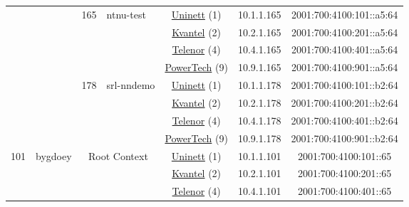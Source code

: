 \begin{small}
\begin{center}
\begin{longtable}{|c|c|c|c|c|c|c|c|}
  &  & \multirow{4}{*}{\tiny{165}} & \multicolumn{1}{|l|}{\multirow{4}{*}{\tiny{ntnu-test}}} & \multicolumn{2}{|c|}{\tiny{\href{https://www.uninett.no}{Uninett} (1)}} & \tiny{10.1.1.165} & \tiny{2001:700:4100:101::a5:64} \\* \cline{5-5}\cline{6-6}\cline{7-7}\cline{8-8}
  &  &  &  & \multicolumn{2}{|c|}{\tiny{\href{http://kvantel.no}{Kvantel} (2)}} & \tiny{10.2.1.165} & \tiny{2001:700:4100:201::a5:64} \\* \cline{5-5}\cline{6-6}\cline{7-7}\cline{8-8}
  &  &  &  & \multicolumn{2}{|c|}{\tiny{\href{https://www.telenor.no}{Telenor} (4)}} & \tiny{10.4.1.165} & \tiny{2001:700:4100:401::a5:64} \\* \cline{5-5}\cline{6-6}\cline{7-7}\cline{8-8}
  &  &  &  & \multicolumn{2}{|c|}{\tiny{\href{http://www.powertech.no}{PowerTech} (9)}} & \tiny{10.9.1.165} & \tiny{2001:700:4100:901::a5:64} \\* \cline{3-3}\cline{4-4}\cline{5-5}\cline{6-6}\cline{7-7}\cline{8-8}
  &  & \multirow{4}{*}{\tiny{178}} & \multicolumn{1}{|l|}{\multirow{4}{*}{\tiny{srl-nndemo}}} & \multicolumn{2}{|c|}{\tiny{\href{https://www.uninett.no}{Uninett} (1)}} & \tiny{10.1.1.178} & \tiny{2001:700:4100:101::b2:64} \\* \cline{5-5}\cline{6-6}\cline{7-7}\cline{8-8}
  &  &  &  & \multicolumn{2}{|c|}{\tiny{\href{http://kvantel.no}{Kvantel} (2)}} & \tiny{10.2.1.178} & \tiny{2001:700:4100:201::b2:64} \\* \cline{5-5}\cline{6-6}\cline{7-7}\cline{8-8}
  &  &  &  & \multicolumn{2}{|c|}{\tiny{\href{https://www.telenor.no}{Telenor} (4)}} & \tiny{10.4.1.178} & \tiny{2001:700:4100:401::b2:64} \\* \cline{5-5}\cline{6-6}\cline{7-7}\cline{8-8}
  &  &  &  & \multicolumn{2}{|c|}{\tiny{\href{http://www.powertech.no}{PowerTech} (9)}} & \tiny{10.9.1.178} & \tiny{2001:700:4100:901::b2:64} \\ \hline
 \multirow{36}{*}{\tiny{101}} & \multicolumn{1}{|l|}{\multirow{36}{*}{\tiny{bygdoey}}} & \multicolumn{2}{|c|}{\multirow{4}{*}{\tiny{Root Context}}} & \multicolumn{2}{|c|}{\tiny{\href{https://www.uninett.no}{Uninett} (1)}} & \tiny{10.1.1.101} & \tiny{2001:700:4100:101::65} \\* \cline{5-5}\cline{6-6}\cline{7-7}\cline{8-8}
  &  & \multicolumn{2}{|c|}{} & \multicolumn{2}{|c|}{\tiny{\href{http://kvantel.no}{Kvantel} (2)}} & \tiny{10.2.1.101} & \tiny{2001:700:4100:201::65} \\* \cline{5-5}\cline{6-6}\cline{7-7}\cline{8-8}
  &  & \multicolumn{2}{|c|}{} & \multicolumn{2}{|c|}{\tiny{\href{https://www.telenor.no}{Telenor} (4)}} & \tiny{10.4.1.101} & \tiny{2001:700:4100:401::65} \\* \cline{5-5}\cline{6-6}\cline{7-7}\cline{8-8}

\end{longtable}
\end{center}
\end{small}
